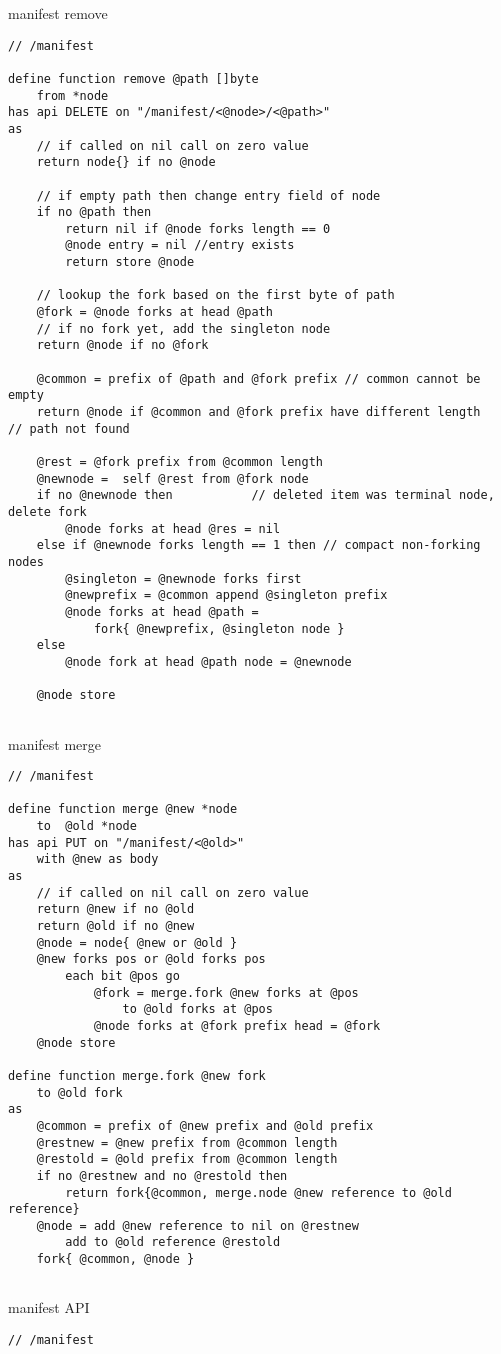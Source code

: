 \begin{definition}{manifest remove}\label{def:manifest-remove}
\begin{lstlisting}[language=buzz1]
// /manifest

define function remove @path []byte 
    from *node
has api DELETE on "/manifest/<@node>/<@path>"
as
    // if called on nil call on zero value
    return node{} if no @node 

    // if empty path then change entry field of node
    if no @path then
        return nil if @node forks length == 0 
        @node entry = nil //entry exists
        return store @node

    // lookup the fork based on the first byte of path
    @fork = @node forks at head @path
    // if no fork yet, add the singleton node 
    return @node if no @fork

    @common = prefix of @path and @fork prefix // common cannot be empty
    return @node if @common and @fork prefix have different length          // path not found
    
    @rest = @fork prefix from @common length
    @newnode =  self @rest from @fork node               
    if no @newnode then           // deleted item was terminal node, delete fork 
        @node forks at head @res = nil
    else if @newnode forks length == 1 then // compact non-forking nodes 
        @singleton = @newnode forks first
        @newprefix = @common append @singleton prefix
        @node forks at head @path = 
            fork{ @newprefix, @singleton node }
    else
        @node fork at head @path node = @newnode
        
    @node store
    

\end{lstlisting}
\end{definition}


\begin{definition}{manifest merge}\label{def:manifest-merge}
\begin{lstlisting}[language=buzz1]
// /manifest

define function merge @new *node  
    to  @old *node 
has api PUT on "/manifest/<@old>"
    with @new as body
as
    // if called on nil call on zero value
    return @new if no @old
    return @old if no @new
    @node = node{ @new or @old } 
    @new forks pos or @old forks pos 
        each bit @pos go 
            @fork = merge.fork @new forks at @pos
                to @old forks at @pos
            @node forks at @fork prefix head = @fork 
    @node store 

define function merge.fork @new fork 
    to @old fork    
as
    @common = prefix of @new prefix and @old prefix 
    @restnew = @new prefix from @common length
    @restold = @old prefix from @common length
    if no @restnew and no @restold then  
        return fork{@common, merge.node @new reference to @old reference}
    @node = add @new reference to nil on @restnew 
        add to @old reference @restold
    fork{ @common, @node }
         
\end{lstlisting}
\end{definition}

\begin{definition}{manifest API}\label{def:manifest-api}
\begin{lstlisting}[language=buzz1]
// /manifest


\end{lstlisting}
\end{definition}